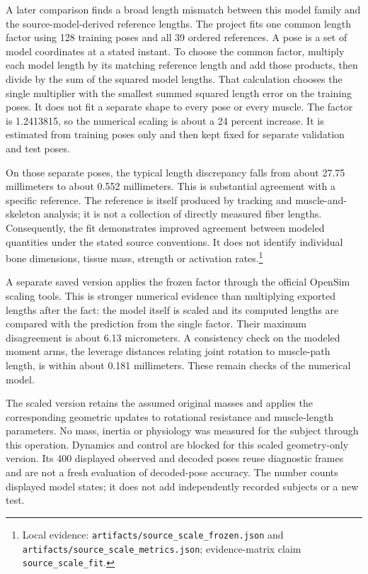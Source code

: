 A later comparison finds a broad length mismatch between this model family and the source-model-derived reference lengths. The project fits one common length factor using 128 training poses and all 39 ordered references. A pose is a set of model coordinates at a stated instant. To choose the common factor, multiply each model length by its matching reference length and add those products, then divide by the sum of the squared model lengths. That calculation chooses the single multiplier with the smallest summed squared length error on the training poses. It does not fit a separate shape to every pose or every muscle. The factor is 1.2413815, so the numerical scaling is about a 24 percent increase. It is estimated from training poses only and then kept fixed for separate validation and test poses.

On those separate poses, the typical length discrepancy falls from about 27.75 millimeters to about 0.552 millimeters. This is substantial agreement with a specific reference. The reference is itself produced by tracking and muscle-and-skeleton analysis; it is not a collection of directly measured fiber lengths. Consequently, the fit demonstrates improved agreement between modeled quantities under the stated source conventions. It does not identify individual bone dimensions, tissue mass, strength or activation rates.\footnote{Local evidence: \texttt{artifacts/source\_scale\_frozen.json} and \texttt{artifacts/\allowbreak{}source\_\allowbreak{}scale\_\allowbreak{}metrics.json}; evidence-matrix claim \texttt{source\_scale\_fit}.}

A separate saved version applies the frozen factor through the official OpenSim scaling tools. This is stronger numerical evidence than multiplying exported lengths after the fact: the model itself is scaled and its computed lengths are compared with the prediction from the single factor. Their maximum disagreement is about 6.13 micrometers. A consistency check on the modeled moment arms, the leverage distances relating joint rotation to muscle-path length, is within about 0.181 millimeters. These remain checks of the numerical model.\cite{opensim2018}

The scaled version retains the assumed original masses and applies the corresponding geometric updates to rotational resistance and muscle-length parameters. No mass, inertia or physiology was measured for the subject through this operation. Dynamics and control are blocked for this scaled geometry-only version. Its 400 displayed observed and decoded poses reuse diagnostic frames and are not a fresh evaluation of decoded-pose accuracy. The number counts displayed model states; it does not add independently recorded subjects or a new test.

